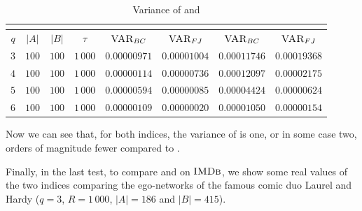 \begin{table}[h]
	\centering
	\begin{tabular}{|c|c|c|c|c|c|c|c|}
		\cline{5-8}
		\multicolumn{4}{c|}{} & \multicolumn{2}{c|}{\fsamp} & \multicolumn{2}{c|}{\base}\\
		\hline
		$q$ & $|A|$ & $|B|$ & $\tau$      & $\textsc{VAR}_{BC}$ & $\textsc{VAR}_{FJ}$ & $\textsc{VAR}_{BC}$ & $\textsc{VAR}_{FJ}$ \\ \hline 
		$3$ & $100$ & $100$ & $1\,000$ & $0.00000971$        & $0.00001004$        & $0.00011746$        & $0.00019368$        \\ \hline
		$4$ & $100$ & $100$ & $1\,000$ & $0.00000114$        & $0.00000736$        & $0.00012097$        & $0.00002175$        \\ \hline
		$5$ & $100$ & $100$ & $1\,000$ & $0.00000594$        & $0.00000085$        & $0.00004424$        & $0.00000624$        \\ \hline
		$6$ & $100$ & $100$ & $1\,000$ & $0.00000109$        & $0.00000020$        & $0.00001050$        & $0.00000154$        \\ \hline
	\end{tabular}
	\caption{Variance of \fsamp and \base}	
\end{table}

Now we can see that, for both indices, the variance of \fsamp is one, or in some case two, orders of magnitude fewer compared to \base.

Finally, in the last test, to compare \fsamp and \base on $\textsc{IMDb}$, we show some real values of the two indices comparing the ego-networks of the famous comic duo Laurel and Hardy
($q=3$, $R=1\,000$, $|A| = 186$ and $|B| = 415$).

